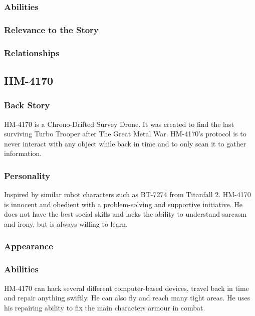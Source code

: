 \documentclass[12pt]{article}
\begin{document}
\subsubsection{Abilities}

\subsubsection{Relevance to the Story}

\subsubsection{Relationships}

\subsection{HM-4170}

\subsubsection{Back Story}

HM-4170 is a Chrono-Drifted Survey Drone. It was created to find the last surviving Turbo Trooper after The Great Metal War. HM-4170's protocol is to never interact with any object while back in time and to only scan it to gather information.

\subsubsection{Personality}

Inspired by similar robot characters such as BT-7274 from Titanfall 2. HM-4170 is innocent and obedient with a problem-solving and supportive initiative. He does not have the best social skills and lacks the ability to understand sarcasm and irony, but is always willing to learn.

\subsubsection{Appearance}

\subsubsection{Abilities}

HM-4170 can hack several different computer-based devices, travel back in time and repair anything swiftly. He can also fly and reach many tight areas. He uses his repairing ability to fix the main characters armour in combat. 
\end{document}
